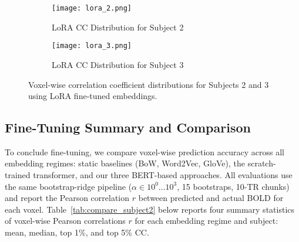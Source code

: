 \documentclass{article}
\begin{document}
\begin{figure}[htbp]
\centering
\begin{subfigure}[b]{0.45\linewidth}
    \centering
    \texttt{[image: lora\_2.png]}
    \caption{LoRA CC Distribution for Subject 2}
    \label{fig:lora_cc_2}
\end{subfigure}
\hfill
\begin{subfigure}[b]{0.45\linewidth}
    \centering
    \texttt{[image: lora\_3.png]}
    \caption{LoRA CC Distribution for Subject 3}
    \label{fig:lora_cc_3}
\end{subfigure}
\caption{Voxel-wise correlation coefficient distributions for Subjects 2 and 3 using LoRA fine-tuned embeddings.}
\label{fig:lora_ccs}
\end{figure}

\subsection{Fine-Tuning Summary and Comparison}

To conclude fine-tuning, we compare voxel-wise prediction accuracy across all embedding regimes: static baselines (BoW, Word2Vec, GloVe), the scratch-trained transformer, and our three BERT-based approaches. All evaluations use the same bootstrap-ridge pipeline ($\alpha \in 10^0 ... 10^3$, 15 bootstraps, 10-TR chunks) and
report the Pearson correlation $r$ between predicted and actual BOLD for each voxel. Table~\ref{tab:compare_subject2} below reports four summary statistics of voxel-wise Pearson correlations $r$ for each embedding regime and subject: mean, median, top 1\%, and top 5\% CC.
\end{document}
